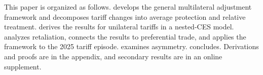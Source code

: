 This paper is organized as follows.  develops the general multilateral adjustment framework and decomposes tariff changes into average protection and relative treatment.  derives the results for unilateral tariffs in a nested-CES model.  analyzes retaliation, connects the results to preferential trade, and applies the framework to the 2025 tariff episode.  examines asymmetry.  concludes. Derivations and proofs are in the appendix, and secondary results are in an online supplement.
